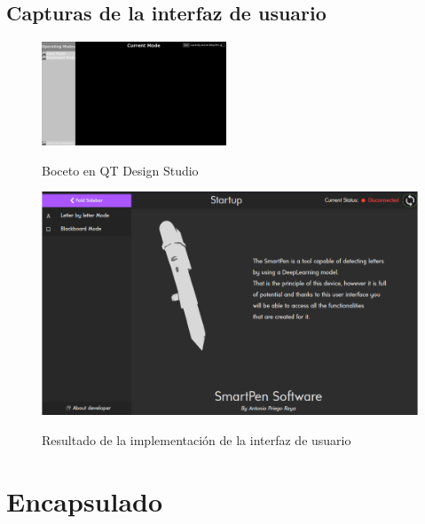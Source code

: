 \begin{appendices}
\section{Capturas de la interfaz de usuario\label{ifazUsu}}
\begin{figure}[h]
    \centering
    \includegraphics[angle=270,width=0.49\textwidth]{capturas/DisenoUsuario2.png}\\[-0,35cm]
    \caption{Boceto en QT Design Studio}
\end{figure}

\begin{figure}[h]
    \centering
    \includegraphics[angle=90,width=1\textwidth]{capturas/Interfaz.png}\\[-0,35cm]
    \caption{Resultado de la implementación de la interfaz de usuario}
\end{figure}

\chapter{Encapsulado}

\end{appendices}
